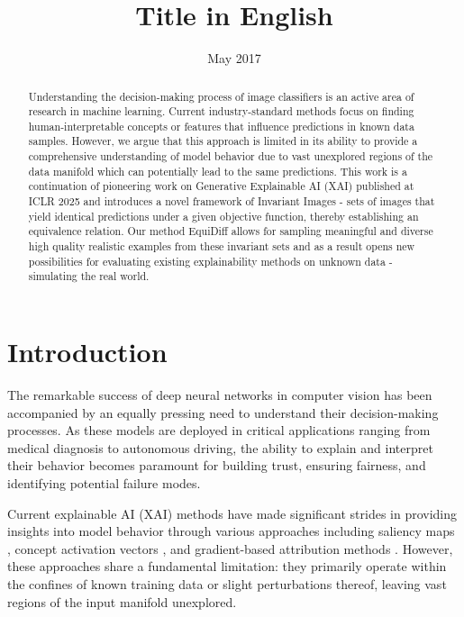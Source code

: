 \documentclass[licencjacka,en]{pracamgr}
\title{Title in English}
\date{May 2017}
\newcommand{\method}[1]{EquiDiff}  %
\newcommand{\invariantimages}[1]{Invariant Images}  %
\begin{document}
\maketitle

\begin{abstract}
Understanding the decision-making process of image classifiers is an active area of research in machine learning. Current industry-standard methods focus on finding human-interpretable concepts or features that influence predictions in known data samples. However, we argue that this approach is limited in its ability to provide a comprehensive understanding of model behavior due to vast unexplored regions of the data manifold which can potentially lead to the same predictions. This work is a continuation of pioneering work on Generative Explainable AI (XAI) \cite{sobieski2024rethinkingvisualcounterfactualexplanations} published at ICLR 2025 and introduces a novel framework of \invariantimages{} - sets of images that yield identical predictions under a given objective function, thereby establishing an equivalence relation. Our method \method{} allows for sampling meaningful and diverse high quality realistic examples from these invariant sets and as a result opens new possibilities for evaluating existing explainability methods on unknown data - simulating the real world.
\end{abstract}

\tableofcontents

\chapter{Introduction}\label{r:introduction}

The remarkable success of deep neural networks in computer vision has been accompanied by an equally pressing need to understand their decision-making processes. As these models are deployed in critical applications ranging from medical diagnosis to autonomous driving, the ability to explain and interpret their behavior becomes paramount for building trust, ensuring fairness, and identifying potential failure modes.

Current explainable AI (XAI) methods have made significant strides in providing insights into model behavior through various approaches including saliency maps \cite{simonyan2014deepinsideconvolutionalnetworks}, concept activation vectors \cite{kim2018interpretabilityfeatureattributionquantitative}, and gradient-based attribution methods \cite{sundararajan2017axiomaticattributiondeepnetworks}. However, these approaches share a fundamental limitation: they primarily operate within the confines of known training data or slight perturbations thereof, leaving vast regions of the input manifold unexplored.
\end{document}
